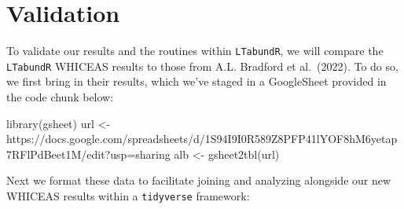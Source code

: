 \documentclass[
]{book}
\newenvironment{Shaded}{\begin{snugshade}}{\end{snugshade}}
\newcommand{\FunctionTok}[1]{\textcolor[rgb]{0.00,0.00,0.00}{#1}}
\newcommand{\NormalTok}[1]{#1}
\newcommand{\OtherTok}[1]{\textcolor[rgb]{0.56,0.35,0.01}{#1}}
\newcommand{\StringTok}[1]{\textcolor[rgb]{0.31,0.60,0.02}{#1}}
\begin{document}
\hypertarget{validation-1}{%
\section*{Validation}\label{validation-1}}

To validate our results and the routines within \texttt{LTabundR}, we will compare the \texttt{LTabundR} WHICEAS results to those from A.L. Bradford et al.~(2022). To do so, we first bring in their results, which we've staged in a GoogleSheet provided in the code chunk below:

\begin{Shaded}
\begin{Highlighting}[]
\FunctionTok{library}\NormalTok{(gsheet)}
\NormalTok{url }\OtherTok{\textless{}{-}} \StringTok{\textquotesingle{}https://docs.google.com/spreadsheets/d/1S94I9I0R589Z8PFP41lYOF8hM6yetap7RFlPdBeet1M/edit?usp=sharing\textquotesingle{}}
\NormalTok{alb }\OtherTok{\textless{}{-}} \FunctionTok{gsheet2tbl}\NormalTok{(url)}
\end{Highlighting}
\end{Shaded}

Next we format these data to facilitate joining and analyzing alongside our new WHICEAS results within a \texttt{tidyverse} framework:
\end{document}
